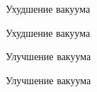 \documentclass[a4paper,12pt]{article}
\begin{document}
    \begin{figure}[!h]
        \caption{Ухудшение вакуума}
    \end{figure}
    \begin{figure}[!h]
        \caption{Ухудшение вакуума}
    \end{figure}

    \begin{figure}[!h]
        \caption{Улучшение вакуума}
    \end{figure}
    \begin{figure}[!h]
        \caption{Улучшение вакуума}
    \end{figure}
\end{document}
